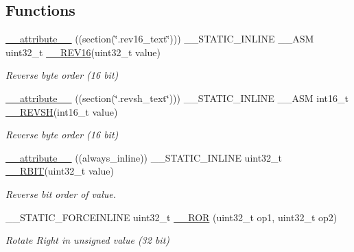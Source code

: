\subsection*{Functions}
\begin{DoxyCompactItemize}
\item 
\hyperlink{group___c_m_s_i_s___core___instruction_interface_gae84a2733711339c5eefeb0d899506b96}{\+\_\+\+\_\+attribute\+\_\+\+\_\+} ((section(\char`\"{}.rev16\+\_\+text\char`\"{}))) \+\_\+\+\_\+\+S\+T\+A\+T\+I\+C\+\_\+\+I\+N\+L\+I\+NE \+\_\+\+\_\+\+A\+SM uint32\+\_\+t \hyperlink{group___c_m_s_i_s___core___instruction_interface_gaa12aedd096506c9639c1581acd5c6a78}{\+\_\+\+\_\+\+R\+E\+V16}(uint32\+\_\+t value)
\begin{DoxyCompactList}\small\item\em Reverse byte order (16 bit) \end{DoxyCompactList}\item 
\hyperlink{group___c_m_s_i_s___core___instruction_interface_gabe2b619a40cc0a7ffa8f765249ccf682}{\+\_\+\+\_\+attribute\+\_\+\+\_\+} ((section(\char`\"{}.revsh\+\_\+text\char`\"{}))) \+\_\+\+\_\+\+S\+T\+A\+T\+I\+C\+\_\+\+I\+N\+L\+I\+NE \+\_\+\+\_\+\+A\+SM int16\+\_\+t \hyperlink{group___c_m_s_i_s___core___instruction_interface_gacb695341318226a5f69ed508166622ac}{\+\_\+\+\_\+\+R\+E\+V\+SH}(int16\+\_\+t value)
\begin{DoxyCompactList}\small\item\em Reverse byte order (16 bit) \end{DoxyCompactList}\item 
\hyperlink{group___c_m_s_i_s___core___instruction_interface_gab926fe7178a379c3a7c0410b06fcb661}{\+\_\+\+\_\+attribute\+\_\+\+\_\+} ((always\+\_\+inline)) \+\_\+\+\_\+\+S\+T\+A\+T\+I\+C\+\_\+\+I\+N\+L\+I\+NE uint32\+\_\+t \hyperlink{group___c_m_s_i_s___core___instruction_interface_gaf944a7b7d8fd70164cca27669316bcf7}{\+\_\+\+\_\+\+R\+B\+IT}(uint32\+\_\+t value)
\begin{DoxyCompactList}\small\item\em Reverse bit order of value. \end{DoxyCompactList}\item 
\+\_\+\+\_\+\+S\+T\+A\+T\+I\+C\+\_\+\+F\+O\+R\+C\+E\+I\+N\+L\+I\+NE uint32\+\_\+t \hyperlink{group___c_m_s_i_s___core___instruction_interface_gab16acb6456176f1e87a4f2724c2b6028}{\+\_\+\+\_\+\+R\+OR} (uint32\+\_\+t op1, uint32\+\_\+t op2)
\begin{DoxyCompactList}\small\item\em Rotate Right in unsigned value (32 bit) \end{DoxyCompactList}\item 

\end{DoxyCompactItemize}
